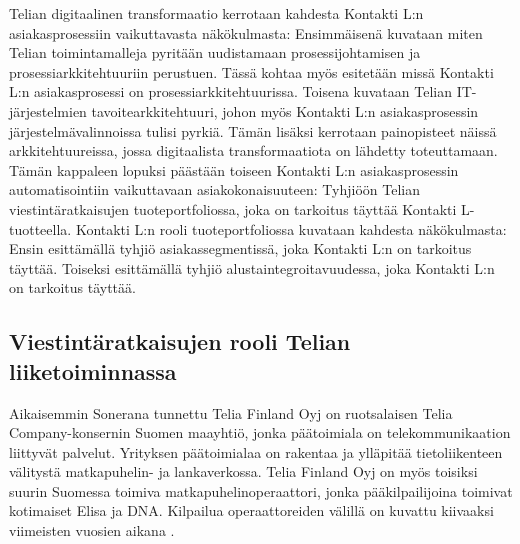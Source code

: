 \documentclass[finnish,12pt,a4paper,pdftex]{article}
\begin{document}
Telian digitaalinen transformaatio kerrotaan kahdesta Kontakti L:n asiakasprosessiin vaikuttavasta näkökulmasta: Ensimmäisenä kuvataan miten Telian toimintamalleja pyritään uudistamaan prosessijohtamisen ja prosessiarkkitehtuuriin perustuen. Tässä kohtaa myös esitetään missä Kontakti L:n asiakasprosessi on prosessiarkkitehtuurissa. Toisena kuvataan Telian IT-järjestelmien tavoitearkkitehtuuri, johon myös Kontakti L:n asiakasprosessin järjestelmävalinnoissa tulisi pyrkiä. Tämän lisäksi kerrotaan painopisteet näissä arkkitehtuureissa, jossa digitaalista transformaatiota on lähdetty toteuttamaan.\\

Tämän kappaleen lopuksi päästään toiseen Kontakti L:n asiakasprosessin automatisointiin vaikuttavaan asiakokonaisuuteen: Tyhjiöön Telian viestintäratkaisujen tuoteportfoliossa, joka on tarkoitus täyttää Kontakti L-tuotteella. Kontakti L:n rooli tuoteportfoliossa kuvataan kahdesta näkökulmasta: Ensin esittämällä tyhjiö asiakassegmentissä, joka Kontakti L:n on tarkoitus täyttää. Toiseksi esittämällä tyhjiö alustaintegroitavuudessa, joka Kontakti L:n on tarkoitus täyttää.





\subsection{Viestintäratkaisujen rooli Telian liiketoiminnassa}

Aikaisemmin Sonerana tunnettu Telia Finland Oyj on ruotsalaisen Telia Company-konsernin Suomen maayhtiö, jonka päätoimiala on telekommunikaation liittyvät palvelut. Yrityksen päätoimialaa on rakentaa ja ylläpitää tietoliikenteen välitystä matkapuhelin- ja lankaverkossa. Telia Finland Oyj on myös toisiksi suurin Suomessa toimiva matkapuhelinoperaattori, jonka pääkilpailijoina toimivat kotimaiset Elisa ja DNA. Kilpailua operaattoreiden välillä on kuvattu kiivaaksi viimeisten vuosien aikana \citep{hesari}. \\
\end{document}
